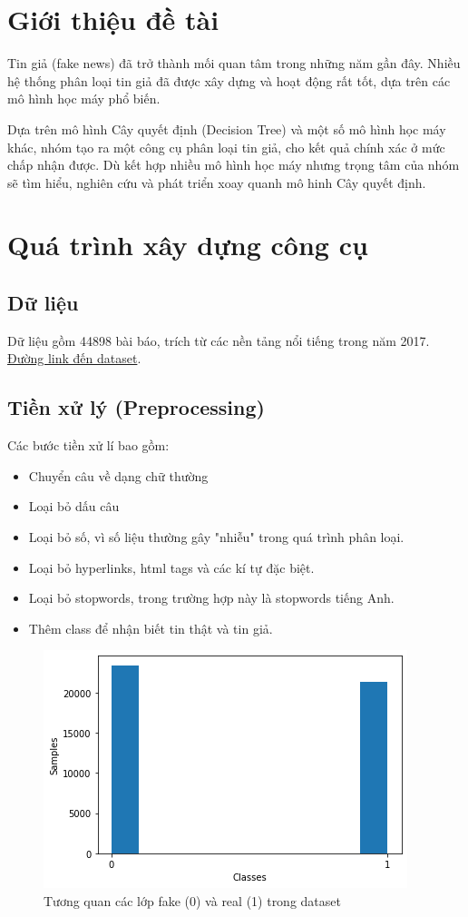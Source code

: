 \documentclass[12pt]{article}
\begin{document}
\begin{titlepage}
\vfill
\end{titlepage}
	
	
\tableofcontents
\pagebreak

\section{Giới thiệu đề tài}
Tin giả (fake news) đã trở thành mối quan tâm trong những năm gần đây. Nhiều hệ thống phân loại tin giả đã được xây dựng và hoạt động rất tốt, dựa trên các mô hình học máy phổ biến.

Dựa trên mô hình Cây quyết định (Decision Tree) và một số mô hình học máy khác, nhóm tạo ra một công cụ phân loại tin giả, cho kết quả chính xác ở mức chấp nhận được. Dù kết hợp nhiều mô hình học máy nhưng trọng tâm của nhóm sẽ tìm hiểu, nghiên cứu và phát triển xoay quanh mô hinh Cây quyết định.
\section{Quá trình xây dựng công cụ}
\subsection{Dữ liệu}
Dữ liệu gồm 44898 bài báo, trích từ các nền tảng nổi tiếng trong năm 2017. \href{https://www.kaggle.com/datasets/clmentbisaillon/fake-and-real-news-dataset}{Đường link đến dataset}.

\subsection{Tiền xử lý (Preprocessing)}
Các bước tiền xử lí bao gồm:
\begin{itemize}
\item Chuyển câu về dạng chữ thường
\item Loại bỏ dấu câu
\item Loại bỏ số, vì số liệu thường gây "nhiễu" trong quá trình phân loại.
\item Loại bỏ hyperlinks, html tags và các kí tự đặc biệt.
\item Loại bỏ stopwords, trong trường hợp này là stopwords tiếng Anh.
\item Thêm class để nhận biết tin thật và tin giả.
\end{itemize}
\begin{figure}[H]
    \centering
    \includegraphics[scale=.8]{img/data-summerise.png}
    \caption{Tương quan các lớp fake (0) và real (1) trong dataset}
    \label{fig:real_fake_in_train}
\end{figure}
\end{document}
